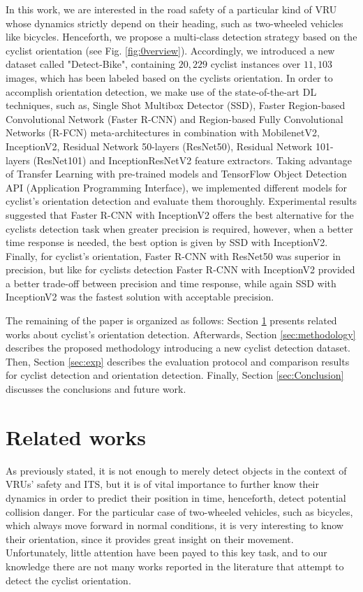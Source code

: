 \documentclass[journal]{IEEEtran}
\begin{document}
In this work, we are interested in the road safety of a particular kind of VRU whose dynamics strictly depend on their heading, such as two-wheeled vehicles like bicycles. Henceforth, we propose a multi-class detection strategy based on the cyclist orientation (see Fig. \ref{fig:0verview}). Accordingly, we introduced a new dataset called "Detect-Bike", containing $20,229$ cyclist instances over $11,103$ images, which has been labeled based on the cyclists orientation. In order to accomplish orientation detection, we make use of the state-of-the-art DL techniques, such as, Single Shot Multibox Detector (SSD), Faster Region-based Convolutional Network (Faster R-CNN) and Region-based Fully Convolutional Networks (R-FCN) meta-architectures in combination with MobilenetV2, InceptionV2, Residual Network 50-layers (ResNet50), Residual Network 101-layers (ResNet101) and InceptionResNetV2 feature extractors. Taking advantage of Transfer Learning with pre-trained models and TensorFlow Object Detection API (Application Programming Interface), we implemented different models for cyclist's orientation detection and evaluate them thoroughly. Experimental results suggested that Faster R-CNN with InceptionV2 offers the best alternative for the cyclists detection task when greater precision is required, however, when a better time response is needed, the best option is given by SSD with InceptionV2. Finally, for cyclist's orientation, Faster R-CNN with ResNet50 was superior in precision, but like for cyclists detection Faster R-CNN with InceptionV2 provided a better trade-off between precision and time response, while again SSD with InceptionV2 was the fastest solution with acceptable precision.

The remaining of the paper is organized as follows: Section \ref{sec:relatedWorks} presents related works about cyclist's orientation detection. Afterwards, Section \ref{sec:methodology} describes the proposed methodology introducing a new cyclist detection dataset. Then, Section \ref{sec:exp} describes the evaluation protocol and comparison results for cyclist detection and orientation detection. Finally, Section \ref{sec:Conclusion} discusses the conclusions and future work.

\section{Related works}
\label{sec:relatedWorks}

As previously stated, it is not enough to merely detect objects in the context of VRUs' safety and ITS, but it is of vital importance to further know their dynamics in order to predict their position in time, henceforth, detect potential collision danger. For the particular case of two-wheeled vehicles, such as bicycles, which always move forward in normal conditions, it is very interesting to know their orientation, since it provides great insight on their movement. Unfortunately, little attention have been payed to this key task, and to our knowledge there are not many works reported in the literature that attempt to detect the cyclist orientation. 
\end{document}
